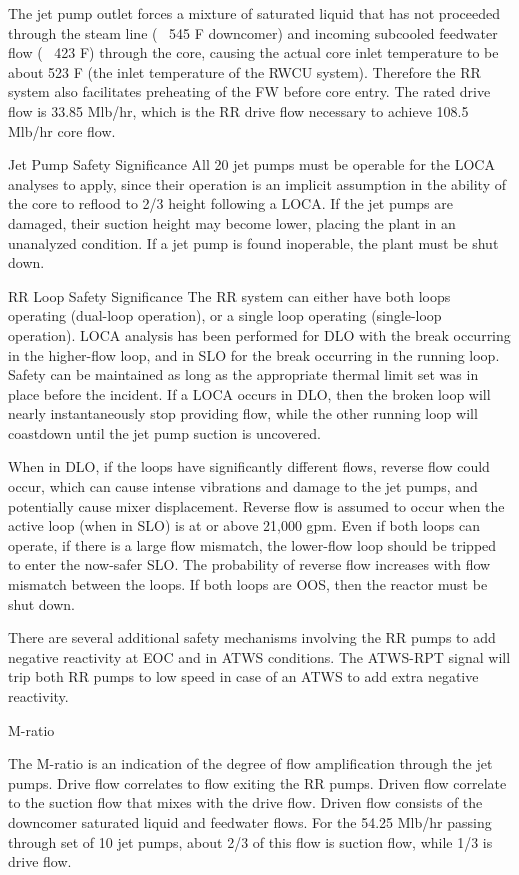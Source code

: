 \documentclass[10pt]{article}
\begin{document}
The jet pump outlet forces a mixture of saturated liquid that has not proceeded through the steam line (~ 545 F downcomer) and incoming subcooled feedwater flow (~ 423 F) through the core, causing the actual core inlet temperature to be about 523 F (the inlet temperature of the RWCU system). Therefore the RR system also facilitates preheating of the FW before core entry. The rated drive flow is 33.85 Mlb/hr, which is the RR drive flow necessary to achieve 108.5 Mlb/hr core flow. 

Jet Pump Safety Significance
All 20 jet pumps must be operable for the LOCA analyses to apply, since their operation is an implicit assumption in the ability of the core to reflood to 2/3 height following a LOCA. If the jet pumps are damaged, their suction height may become lower, placing the plant in an unanalyzed condition. If a jet pump is found inoperable, the plant must be shut down. 

RR Loop Safety Significance
The RR system can either have both loops operating (dual-loop operation), or a single loop operating (single-loop operation). LOCA analysis has been performed for DLO with the break occurring in the higher-flow loop, and in SLO for the break occurring in the running loop. Safety can be maintained as long as the appropriate thermal limit set was in place before the incident. If a LOCA occurs in DLO, then the broken loop will nearly instantaneously stop providing flow, while the other running loop will coastdown until the jet pump suction is uncovered. 

When in DLO, if the loops have significantly different flows, reverse flow could occur, which can cause intense vibrations and damage to the jet pumps, and potentially cause mixer displacement. Reverse flow is assumed to occur when the active loop (when in SLO) is at or above 21,000 gpm. Even if both loops can operate, if there is a large flow mismatch, the lower-flow loop should be tripped to enter the now-safer SLO. The probability of reverse flow increases with flow mismatch between the loops. If both loops are OOS, then the reactor must be shut down. 

There are several additional safety mechanisms involving the RR pumps to add negative reactivity at EOC and in ATWS conditions. The ATWS-RPT signal will trip both RR pumps to low speed in case of an ATWS to add extra negative reactivity. 

M-ratio


The M-ratio is an indication of the degree of flow amplification through the jet pumps. Drive flow correlates to flow exiting the RR pumps. Driven flow correlate to the suction flow that mixes with the drive flow. Driven flow consists of the downcomer saturated liquid and feedwater flows. For the 54.25 Mlb/hr passing through set of 10 jet pumps, about 2/3 of this flow is suction flow, while 1/3 is drive flow.  
\end{document}
